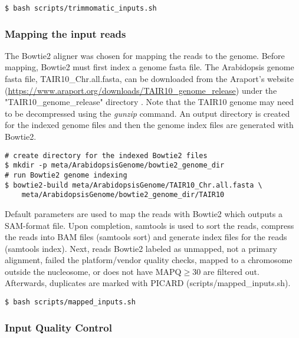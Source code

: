 \documentclass{article}
\begin{document}
\begin{sloppypar}
\begin{verbatim}
$ bash scripts/trimmomatic_inputs.sh
\end{verbatim}

\subsubsection{Mapping the input reads}

The Bowtie2 aligner was chosen for mapping the reads to the genome. Before mapping, Bowtie2 must first index a  genome fasta file. The Arabidopsis genome fasta file, TAIR10\_Chr.all.fasta, can be downloaded from the Araport's website (\url{https://www.araport.org/downloads/TAIR10_genome_release}) under the "TAIR10\_genome\_release" directory \cite{Araport11}. Note that the TAIR10 genome may need to be decompressed  using the \emph{gunzip} command. An output directory is created for the indexed genome files and then the genome index files are generated with Bowtie2.

\begin{verbatim}
# create directory for the indexed Bowtie2 files
$ mkdir -p meta/ArabidopsisGenome/bowtie2_genome_dir
# run Bowtie2 genome indexing
$ bowtie2-build meta/ArabidopsisGenome/TAIR10_Chr.all.fasta \
    meta/ArabidopsisGenome/bowtie2_genome_dir/TAIR10
\end{verbatim}

Default parameters are used to map the reads with Bowtie2 which outputs a SAM-format file. Upon completion, samtools is used to sort the reads, compress the reads into BAM files (samtools sort) and generate index files for the reads (samtools index).  Next, reads Bowtie2 labeled as unmapped, not a primary alignment, failed the platform/vendor quality checks, mapped to a chromosome outside the nucleosome, or does not have MAPQ$\geq$30 are filtered out. Afterwards, duplicates are marked with PICARD  ({\selectfont scripts/mapped\_inputs.sh}).

\begin{verbatim}
$ bash scripts/mapped_inputs.sh
\end{verbatim}

\subsubsection{Input Quality Control}


\end{sloppypar}
\end{document}
